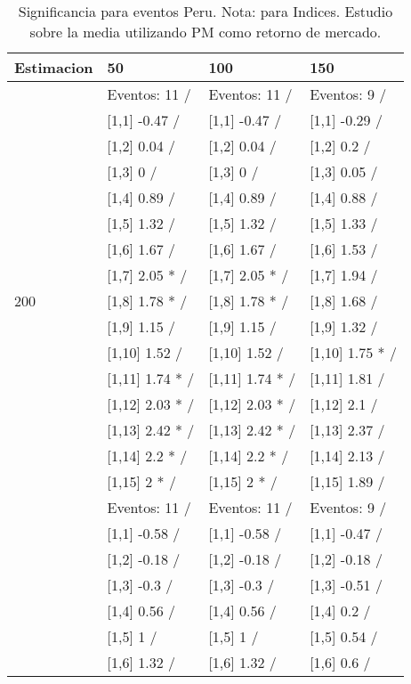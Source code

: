 \begin{table}

\caption{Significancia para eventos Peru. Nota: para Indices. Estudio sobre la media utilizando PM como retorno de mercado.}
\centering
\begin{tabular}[t]{llll}
\toprule
Estimacion & 50 & 100 & 150\\
\midrule
 & Eventos:  11 / & Eventos:  11 / & Eventos:  9 /\\
 & {}[1,1] -0.47  / & {}[1,1] -0.47  / & {}[1,1] -0.29  /\\
 & {}[1,2] 0.04  / & {}[1,2] 0.04  / & {}[1,2] 0.2  /\\
 & {}[1,3] 0  / & {}[1,3] 0  / & {}[1,3] 0.05  /\\
 & {}[1,4] 0.89  / & {}[1,4] 0.89  / & {}[1,4] 0.88  /\\
\addlinespace
 & {}[1,5] 1.32  / & {}[1,5] 1.32  / & {}[1,5] 1.33  /\\
 & {}[1,6] 1.67  / & {}[1,6] 1.67  / & {}[1,6] 1.53  /\\
 & {}[1,7] 2.05 * / & {}[1,7] 2.05 * / & {}[1,7] 1.94  /\\
200 & {}[1,8] 1.78 * / & {}[1,8] 1.78 * / & {}[1,8] 1.68  /\\
 & {}[1,9] 1.15  / & {}[1,9] 1.15  / & {}[1,9] 1.32  /\\
\addlinespace
 & {}[1,10] 1.52  / & {}[1,10] 1.52  / & {}[1,10] 1.75 * /\\
 & {}[1,11] 1.74 * / & {}[1,11] 1.74 * / & {}[1,11] 1.81  /\\
 & {}[1,12] 2.03 * / & {}[1,12] 2.03 * / & {}[1,12] 2.1  /\\
 & {}[1,13] 2.42 * / & {}[1,13] 2.42 * / & {}[1,13] 2.37  /\\
 & {}[1,14] 2.2 * / & {}[1,14] 2.2 * / & {}[1,14] 2.13  /\\
\addlinespace
 & {}[1,15] 2 * / & {}[1,15] 2 * / & {}[1,15] 1.89  /\\
 & Eventos:  11 / & Eventos:  11 / & Eventos:  9 /\\
 & {}[1,1] -0.58  / & {}[1,1] -0.58  / & {}[1,1] -0.47  /\\
 & {}[1,2] -0.18  / & {}[1,2] -0.18  / & {}[1,2] -0.18  /\\
 & {}[1,3] -0.3  / & {}[1,3] -0.3  / & {}[1,3] -0.51  /\\
\addlinespace
 & {}[1,4] 0.56  / & {}[1,4] 0.56  / & {}[1,4] 0.2  /\\
 & {}[1,5] 1  / & {}[1,5] 1  / & {}[1,5] 0.54  /\\
 & {}[1,6] 1.32  / & {}[1,6] 1.32  / & {}[1,6] 0.6  /\\

\end{tabular}
\end{table}
